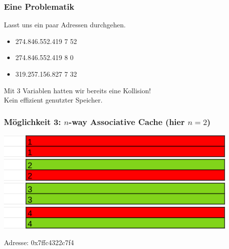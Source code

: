 \documentclass{beamer}
\begin{document}
%
\begin{frame}
\frametitle{Eine Problematik}
Lasst uns ein paar Adressen durchgehen.

\begin{itemize}
    \item {\color{brown}274.846.552.419} {\color{blue}7} {\color{orange}52}
    
    \item {\color{brown}274.846.552.419} {\color{blue}8} {\color{orange}0}
    
    \item {\color{brown}319.257.156.827} {\color{blue}7} {\color{orange}32}
    
\end{itemize}
Mit 3 Variablen hatten wir bereits eine Kollision!\\
Kein effizient genutzter Speicher.
\end{frame}


%
%
\begin{frame}
\frametitle{M\"oglichkeit 3: $n$-way Associative Cache (hier $n=2$)}
\centerline{\includegraphics[width=12cm]{nac1.png}}
Adresse: 0x7ffc4322c7f4
\end{frame}
\end{document}

